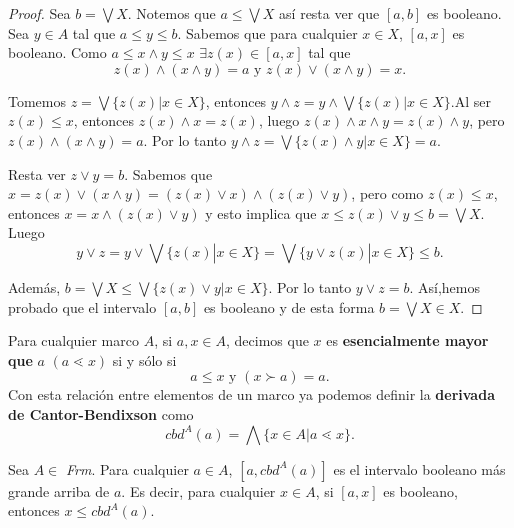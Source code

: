 \begin{proof}
Sea $b=\bigvee X$. Notemos que $a\leq\bigvee X$ así resta ver que $[a, b]$ es booleano.\\
\noindent
Sea $y\in A$ tal que $a\leq y\leq b$. Sabemos que para cualquier $x\in X$, $[a, x]$ es booleano. Como $a\leq x\wedge y\leq x$ $\exists z(x)\in [a,x]$ tal que 
$$z(x)\wedge (x\wedge y)=a\mbox{  y  }z(x)\vee (x\wedge y)=x.$$

\noindent
Tomemos $z=\bigvee\{z(x)|x\in X\}$, entonces $y\wedge z=y\wedge\bigvee\{z(x)|x\in X\}$.Al ser $z(x)\leq x$, entonces $z(x)\wedge x=z(x)$, luego $z(x)\wedge x\wedge y=z(x)\wedge y$, pero  $z(x)\wedge(x\wedge y)=a$. Por lo tanto $y\wedge z=\bigvee\{z(x)\wedge y|x\in X\}=a$.

\noindent
Resta ver $z\vee y=b$. Sabemos que $x=z(x)\vee (x\wedge y)=(z(x)\vee x)\wedge (z(x)\vee y)$, pero como $z(x)\leq x$, entonces $x=x\wedge (z(x)\vee y)$ y esto implica que $x\leq z(x)\vee y\leq b=\bigvee X.$ Luego $$y\vee z=y\vee\bigvee\{z(x)|x\in X\}=\bigvee\{y\vee z(x)|x\in X\}\leq b.$$

\noindent
Además, $b=\bigvee X\leq \bigvee\{z(x)\vee y|x\in X\}$. Por lo tanto $y\vee z=b.$ Así,hemos probado que el intervalo $[a,b]$ es booleano y de esta forma $b=\bigvee X\in X$.
\end{proof}

\begin{definition}
Para cualquier marco $A$, si $a,x\in A$, decimos que $x$  es \textbf{esencialmente mayor que} $a$ $(a\lessdot x)$ si y sólo si $$a\leq x\mbox{  y  }(x\succ a)=a.$$
Con esta relación entre elementos de un marco ya podemos definir la \textbf{derivada de Cantor-Bendixson} como $$cbd^A(a)=\bigwedge\{x\in A|a\lessdot x\}.$$
\end{definition}

\begin{lemma}\label{Lema46}
Sea $A\in$ \textit{Frm}. Para cualquier $a\in A$, $[a,cbd^A(a)]$ es el intervalo booleano más grande arriba de $a$. Es decir, para cualquier $x\in A$, si $[a,x]$ es booleano, entonces $x\leq cbd^A(a)$.
\end{lemma}

